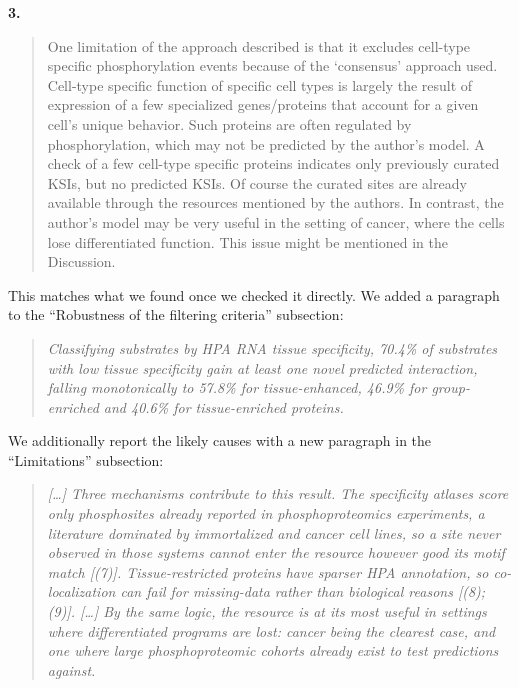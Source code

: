 \documentclass[
]{article}
\begin{document}
\textbf{3.}

\begin{quote}
One limitation of the approach described is that it excludes cell-type
specific phosphorylation events because of the `consensus' approach
used. Cell-type specific function of specific cell types is largely the
result of expression of a few specialized genes/proteins that account
for a given cell's unique behavior. Such proteins are often regulated by
phosphorylation, which may not be predicted by the author's model. A
check of a few cell-type specific proteins indicates only previously
curated KSIs, but no predicted KSIs. Of course the curated sites are
already available through the resources mentioned by the authors. In
contrast, the author's model may be very useful in the setting of
cancer, where the cells lose differentiated function. This issue might
be mentioned in the Discussion.
\end{quote}

This matches what we found once we checked it directly. We added a
paragraph to the ``Robustness of the filtering criteria'' subsection:

\begin{quote}
\emph{Classifying substrates by HPA RNA tissue specificity, 70.4\% of
substrates with low tissue specificity gain at least one novel predicted
interaction, falling monotonically to 57.8\% for tissue-enhanced, 46.9\%
for group-enriched and 40.6\% for tissue-enriched proteins.}
\end{quote}

We additionally report the likely causes with a new paragraph in the
``Limitations'' subsection:

\begin{quote}
\emph{{[}\ldots{]} Three mechanisms contribute to this result. The
specificity atlases score only phosphosites already reported in
phosphoproteomics experiments, a literature dominated by immortalized
and cancer cell lines, so a site never observed in those systems cannot
enter the resource however good its motif match {[}(7){]}.
Tissue-restricted proteins have sparser HPA annotation, so
co-localization can fail for missing-data rather than biological reasons
{[}(8); (9){]}. {[}\ldots{]} By the same logic, the resource is at its
most useful in settings where differentiated programs are lost: cancer
being the clearest case, and one where large phosphoproteomic cohorts
already exist to test predictions against.}
\end{quote}
\end{document}
